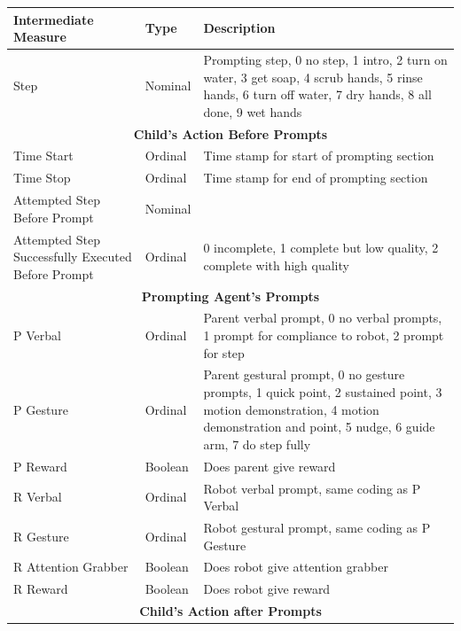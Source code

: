 \documentclass{ut-thesis}
\begin{document}
\begin{table}[H]
	\centering
	\begin{tabular}{ | p{5cm} | l | p{7cm} | }
		\hline
		\textbf{Intermediate Measure}	&	\textbf{Type}	&	\textbf{Description}	\\	\hline	\hline

		Step	&	Nominal	&	Prompting step, 0 no step, 1 intro, 2 turn on water, 3 get soap, 4 scrub hands, 5 rinse hands, 6 turn off water, 7 dry hands, 8 all done, 9 wet hands	\\	\hline \hline

		\multicolumn{3}{|c|}{\textbf{Child's Action Before Prompts}} \\	\hline

		Time Start	&	Ordinal	&	Time stamp for start of prompting section	\\	\hline
		Time Stop	&	Ordinal	&	Time stamp for end of prompting section	\\	\hline
		Attempted Step Before Prompt	&	Nominal	&		\\	\hline
		Attempted Step Successfully Executed Before Prompt	&	Ordinal	&	0 incomplete, 1 complete but low quality, 2 complete with high quality	\\	\hline	\hline

		\multicolumn{3}{|c|}{\textbf{Prompting Agent's Prompts}} \\	\hline

		P Verbal	&	Ordinal	&	Parent verbal prompt, 0 no verbal prompts, 1 prompt for compliance to robot, 2 prompt for step	\\	\hline
		P Gesture	&	Ordinal	&	Parent gestural prompt, 0 no gesture prompts, 1 quick point, 2 sustained point, 3 motion demonstration, 4 motion demonstration and point, 5 nudge, 6 guide arm, 7 do step fully	\\	\hline
		P Reward	&	Boolean	&	Does parent give reward	\\	\hline
		R Verbal	&	Ordinal	&	Robot verbal prompt, same coding as P Verbal	\\	\hline
		R Gesture	&	Ordinal	&	Robot gestural prompt, same coding as P Gesture	\\	\hline
		R Attention Grabber	&	Boolean	&	Does robot give attention grabber	\\	\hline
		R Reward	&	Boolean	&	Does robot give reward	\\	\hline	\hline

		\multicolumn{3}{|c|}{\textbf{Child's Action after Prompts}} \\	\hline


\end{tabular}
\end{table}
\end{document}
